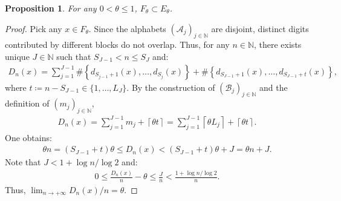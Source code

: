 \documentclass[12pt,reqno]{amsart}
\theoremstyle{definition}
\theoremstyle{plain}
\newtheorem{prop}{Proposition}
\begin{document}
\begin{prop}\label{prop: thm 1 prop 1}
    For any $0<\theta\leq1$, $F_\theta\subset E_\theta$.
\end{prop}
\begin{proof}
Pick any $x\in F_\theta$. Since the alphabets $(\mathcal{A}_j)_{j\in\mathbb{N}}$ are disjoint, distinct digits contributed by different blocks do not overlap. Thus, for any $n\in\mathbb{N}$, there exists unique $J\in\mathbb{N}$ such that $S_{J-1}<n\leq S_J$ and:
\begin{align*}
    D_n(x)=\sum_{j=1}^{J-1}\#\left\{d_{S_{j-1}+1}(x),\ldots,d_{S_{j}}(x)\right\}+\#\left\{d_{S_{J-1}+1}(x),\ldots,d_{S_{J-1}+t}(x)\right\},
\end{align*}
where $t\coloneqq n-S_{J-1}\in\{1,\ldots,L_J\}$. By the construction of $(\mathcal{B}_j)_{j\in\mathbb{N}}$ and the definition of $(m_j)_{j\in\mathbb{N}}$,
\begin{align*}
    D_n(x)
    =\sum_{j=1}^{J-1}m_j+\left\lceil \theta t\right\rceil
    =\sum_{j=1}^{J-1}\left\lceil \theta L_j\right\rceil+\left\lceil \theta t\right\rceil.
\end{align*}
One obtains:
\begin{align*}
    \theta n=(S_{J-1}+t)\theta\leq D_n(x)< (S_{J-1}+t)\theta +J=\theta n+J.
\end{align*}
Note that $J<1+\log{n}/\log{2}$ and:
\begin{align*}
    0\leq\frac{D_n(x)}{n}-\theta\leq \frac{J}{n}<\frac{1+\log{n}/\log{2}}{n}.
\end{align*}
Thus, $\lim_{n\to+\infty}D_n(x)/n=\theta$.
\end{proof}
\end{document}
